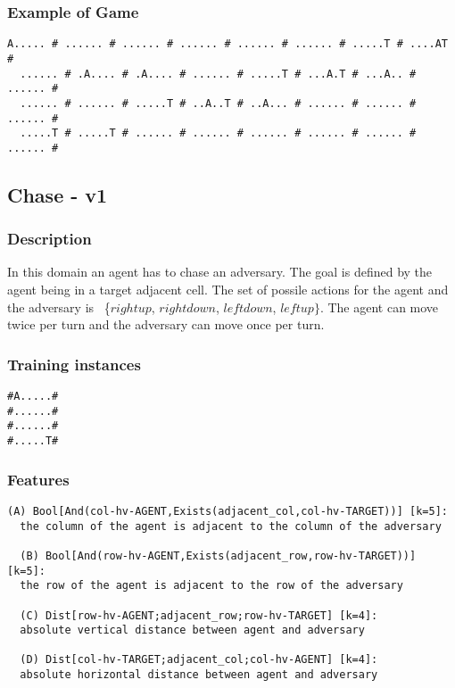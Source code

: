 \documentclass[a4paper]{article}
\begin{document}
\subsubsection{Example of Game}
\begin{Verbatim}[fontsize=\footnotesize]
  A..... # ...... # ...... # ...... # ...... # ...... # .....T # ....AT #
  ...... # .A.... # .A.... # ...... # .....T # ...A.T # ...A.. # ...... #
  ...... # ...... # .....T # ..A..T # ..A... # ...... # ...... # ...... #
  .....T # .....T # ...... # ...... # ...... # ...... # ...... # ...... #
\end{Verbatim}


\subsection{Chase - v1}
\subsubsection{Description}
In this domain an agent has to chase an adversary. The goal is defined by the agent being in a target adjacent cell. The set of possile actions for the agent and the adversary is ~\{$rightup$, $rightdown$, $leftdown$, $leftup\}$. The agent can move twice per turn and the adversary can move once per turn.

\subsubsection{Training instances}
\begin{Verbatim}[fontsize=\footnotesize]
#A.....#
#......#
#......#
#.....T#
\end{Verbatim}

\subsubsection{Features}
\begin{Verbatim}[fontsize=\footnotesize]
  (A) Bool[And(col-hv-AGENT,Exists(adjacent_col,col-hv-TARGET))] [k=5]:
  the column of the agent is adjacent to the column of the adversary

  (B) Bool[And(row-hv-AGENT,Exists(adjacent_row,row-hv-TARGET))] [k=5]:
  the row of the agent is adjacent to the row of the adversary

  (C) Dist[row-hv-AGENT;adjacent_row;row-hv-TARGET] [k=4]:
  absolute vertical distance between agent and adversary

  (D) Dist[col-hv-TARGET;adjacent_col;col-hv-AGENT] [k=4]:
  absolute horizontal distance between agent and adversary
\end{Verbatim}
\end{document}
